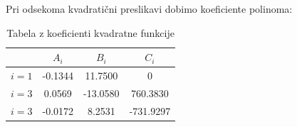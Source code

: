 \documentclass[12pt,a4paper]{article}
\begin{document}
Pri odsekoma kvadratični preslikavi dobimo koeficiente polinoma:
\begin{table}[h]
\centering
        \begin{tabular}{|c|c|c|c|}
      \hline
      &$A_i$&$B_i$& $C_i$ \\
      \hline
      \hline
      $i= 1$ &-0.1344 &11.7500 &0\\
      \hline
      $i = 3$ &0.0569 &-13.0580&760.3830 \\
      \hline
      $i = 3$ &-0.0172 &    8.2531 &-731.9297\\
      \hline
      
      
      
    \end{tabular}

    \caption{Tabela z koeficienti kvadratne funkcije}
    \label{tab:xxx}
\end{table}
\end{document}
